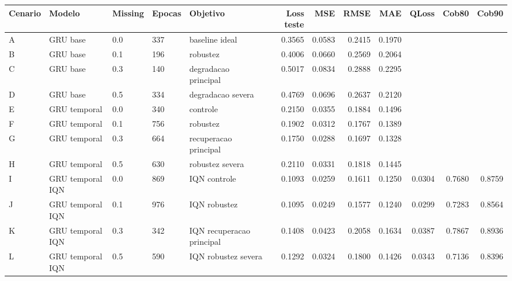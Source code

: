 \begin{tabular}{lllllrrrrrrr}
\hline
Cenario & Modelo & Missing & Epocas & Objetivo & Loss teste & MSE & RMSE & MAE & QLoss & Cob80 & Cob90 \\
\hline
A & GRU base & 0.0 & 337 & baseline ideal & 0.3565 & 0.0583 & 0.2415 & 0.1970 &  &  &  \\
B & GRU base & 0.1 & 196 & robustez & 0.4006 & 0.0660 & 0.2569 & 0.2064 &  &  &  \\
C & GRU base & 0.3 & 140 & degradacao principal & 0.5017 & 0.0834 & 0.2888 & 0.2295 &  &  &  \\
D & GRU base & 0.5 & 334 & degradacao severa & 0.4769 & 0.0696 & 0.2637 & 0.2120 &  &  &  \\
E & GRU temporal & 0.0 & 340 & controle & 0.2150 & 0.0355 & 0.1884 & 0.1496 &  &  &  \\
F & GRU temporal & 0.1 & 756 & robustez & 0.1902 & 0.0312 & 0.1767 & 0.1389 &  &  &  \\
G & GRU temporal & 0.3 & 664 & recuperacao principal & 0.1750 & 0.0288 & 0.1697 & 0.1328 &  &  &  \\
H & GRU temporal & 0.5 & 630 & robustez severa & 0.2110 & 0.0331 & 0.1818 & 0.1445 &  &  &  \\
I & GRU temporal IQN & 0.0 & 869 & IQN controle & 0.1093 & 0.0259 & 0.1611 & 0.1250 & 0.0304 & 0.7680 & 0.8759 \\
J & GRU temporal IQN & 0.1 & 976 & IQN robustez & 0.1095 & 0.0249 & 0.1577 & 0.1240 & 0.0299 & 0.7283 & 0.8564 \\
K & GRU temporal IQN & 0.3 & 342 & IQN recuperacao principal & 0.1408 & 0.0423 & 0.2058 & 0.1634 & 0.0387 & 0.7867 & 0.8936 \\
L & GRU temporal IQN & 0.5 & 590 & IQN robustez severa & 0.1292 & 0.0324 & 0.1800 & 0.1426 & 0.0343 & 0.7136 & 0.8396 \\
\hline
\end{tabular}
